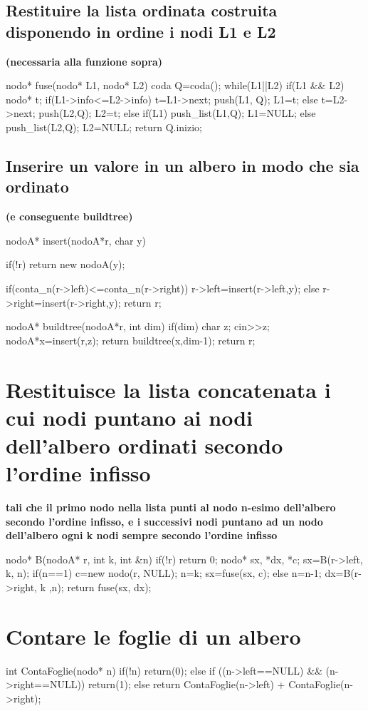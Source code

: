 \subsection{Restituire la lista ordinata costruita disponendo in ordine i nodi L1 e L2} \textbf{(necessaria alla funzione sopra)}
\begin{codice}

nodo* fuse(nodo* L1, nodo* L2) {
coda Q=coda();
while(L1||L2) {
    if(L1 && L2) {
        nodo* t;
        if(L1->info<=L2->info) {
            t=L1->next;
            push(L1, Q);
            L1=t;
        } else {
            t=L2->next;
            push(L2,Q);
            L2=t;
        }
    } else if(L1) {
        push_list(L1,Q);
        L1=NULL;
    } else {
        push_list(L2,Q);
        L2=NULL;
    }
}
return Q.inizio;
}
\end{codice}

\subsection{Inserire un valore in un albero in modo che sia ordinato} 
\textbf{(e conseguente buildtree)}
\begin{codice}

nodoA* insert(nodoA*r, char y) {
if(!r) return new nodoA(y);

if(conta_n(r->left)<=conta_n(r->right))
r->left=insert(r->left,y);
else   
r->right=insert(r->right,y);
return r;
}
nodoA* buildtree(nodoA*r, int dim) {
if(dim)
{
char z;
cin>>z;
nodoA*x=insert(r,z);
return buildtree(x,dim-1);
}
return r;
}
\end{codice}

\section{Restituisce la lista concatenata i cui nodi puntano ai nodi dell’albero ordinati secondo l’ordine infisso} 
\textbf{tali che il primo nodo nella lista punti al nodo n-esimo dell’albero secondo l’ordine infisso, e i successivi nodi puntano ad un nodo dell’albero ogni k nodi sempre secondo l’ordine infisso}
\begin{codice}

nodo* B(nodoA* r, int k, int &n) {
if(!r) return 0;
nodo* sx, *dx, *c;
sx=B(r->left, k, n);
if(n==1) {
    c=new nodo(r, NULL);
    n=k;
    sx=fuse(sx, c);
} else n=n-1;
dx=B(r->right, k ,n);
return fuse(sx, dx);
}
\end{codice}

\section{Contare le foglie di un albero}
\begin{codice}

int ContaFoglie(nodo* n)
{
if(!n) return(0);
else {
    if ((n->left==NULL) && (n->right==NULL)) return(1);
    else return ContaFoglie(n->left) + ContaFoglie(n->right);
}
}
\end{codice}

